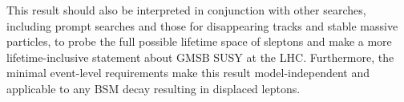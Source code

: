 This result should also be interpreted in conjunction with other searches, including prompt searches and those for disappearing tracks and stable massive particles, to probe the full possible lifetime space of sleptons and make a more lifetime-inclusive statement about \ac{GMSB} \ac{SUSY} at the \ac{LHC}. Furthermore, the minimal event-level requirements make this result model-independent and applicable to any \ac{BSM} decay resulting in displaced leptons.

